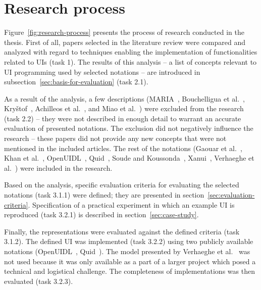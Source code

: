 \section{Research process}\label{sec:research-process}

Figure~\ref{fig:research-process} presents the process of research conducted in the thesis.
First of all, papers selected in the literature review were compared and analyzed with regard to techniques enabling the implementation of functionalities related to UIs (task 1).
The results of this analysis -- a list of concepts relevant to UI programming used by selected notations -- are introduced in subsection~\ref{sec:basis-for-evaluation} (task 2.1).

As a result of the analysis, a few descriptions (MARIA~\cite{Paterno2009, MariaPDF}, Bouchelligua et al.~\cite{Bouchelligua2010}, Kryštof~\cite{kryvstof2010lpgm}, Achilleos et al.~\cite{Achilleos2011}, and Miao et al.~\cite{Miao2017}) were excluded from the research (task 2.2) -- they were not described in enough detail to warrant an accurate evaluation of presented notations.
The exclusion did not negatively influence the research -- these papers did not provide any new concepts that were not mentioned in the included articles.
The rest of the notations (Gaouar et al.~\cite{Gaouar2018}, Khan et al.~\cite{Khan2021}, OpenUIDL~\cite{Moldovan2020}, Quid~\cite{molina2018quid, Molina2019}, Soude and Koussonda~\cite{Soude2022}, Xanui~\cite{hermida2016xanui}, Verhaeghe et al.~\cite{Verhaeghe2021visual, Verhaeghe2021behavior}) were included in the research.

Based on the analysis, specific evaluation criteria for evaluating the selected notations (task 3.1.1) were defined; they are presented in section~\ref{sec:evaluation-criteria}.
Specification of a practical experiment in which an example UI is reproduced (task 3.2.1) is described in section~\ref{sec:case-study}.

Finally, the representations were evaluated against the defined criteria (task 3.1.2).
The defined UI was implemented (task 3.2.2) using two publicly available notations (OpenUIDL~\cite{Moldovan2020}, Quid~\cite{molina2018quid, Molina2019}).
The model presented by Verhaeghe et al.~\cite{Verhaeghe2021visual, Verhaeghe2021behavior} was not used because it was only available as a part of a larger project which posed a technical and logistical challenge.
The completeness of implementations was then evaluated (task 3.2.3).

